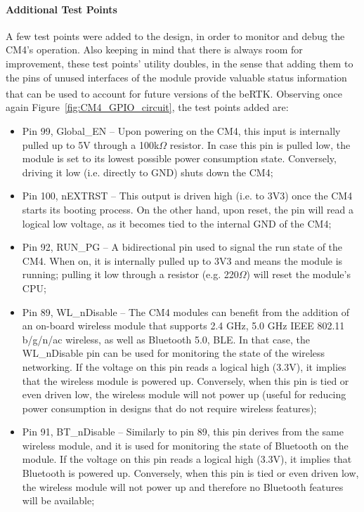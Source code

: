 \paragraph{Additional Test Points}	A few test points were added to the design, in order to monitor and debug the CM4's operation.
Also keeping in mind that there is always room for improvement, these test points' utility doubles, in the sense that adding them to the pins of unused interfaces of the module provide valuable status information that can be used to account for future versions of the beRTK\textsuperscript{\textregistered}.
Observing once again Figure~\ref{fig:CM4_GPIO_circuit}, the test points added are:
\begin{itemize}
	\item Pin 99, Global\_EN -- Upon powering on the CM4, this input is internally pulled up to 5V through a 100k$\Omega$ resistor. In case this pin is pulled low, the module is set to its lowest possible power consumption state. Conversely, driving it low (i.e. directly to GND) shuts down the CM4;
	
	\item Pin 100, nEXTRST -- This output is driven high (i.e. to 3V3) once the CM4 starts its booting process. On the other hand, upon reset, the pin will read a logical low voltage, as it becomes tied to the internal GND of the CM4;
	
	\item Pin 92, RUN\_PG -- A bidirectional pin used to signal the run state of the CM4. When on, it is internally pulled up to 3V3 and means the module is running; pulling it low through a resistor (e.g. 220$\Omega$) will reset the module's CPU;

	\item Pin 89, WL\_nDisable -- The CM4 modules can benefit from the addition of an on-board wireless module that supports 2.4 GHz, 5.0 GHz IEEE 802.11 b/g/n/ac wireless, as well as Bluetooth 5.0, BLE. In that case, the WL\_nDisable pin can be used for monitoring the state of the wireless networking. If the voltage on this pin reads a logical high (3.3V), it implies that the wireless module is powered up. Conversely, when this pin is tied or even driven low, the wireless module will not power up (useful for reducing power consumption in designs that do not require wireless features);

	\item Pin 91, BT\_nDisable -- Similarly to pin 89, this pin derives from the same wireless module, and it is used for monitoring the state of Bluetooth on the module. If the voltage on this pin reads a logical high (3.3V), it implies that Bluetooth is powered up. Conversely, when this pin is tied or even driven low, the wireless module will not power up and therefore no Bluetooth features will be available;
	

\end{itemize}
